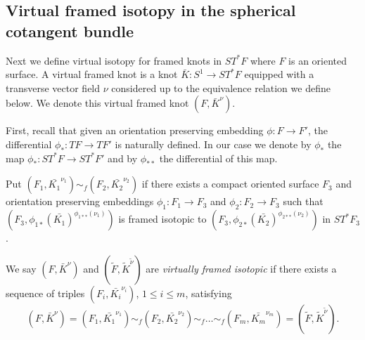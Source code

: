 \subsection{Virtual framed isotopy in the spherical cotangent bundle} 
Next we define virtual isotopy for framed knots in $ST^*F$ where $F$ is an oriented surface.  A virtual framed knot is a knot $\bar{K}:S^1 \rightarrow ST^*F$ equipped with a transverse vector field $\nu$ considered up to the equivalence relation we define below.  We denote this virtual framed knot $(F, \bar{K}^\nu)$.



First, recall that given an orientation preserving embedding $\phi : F \rightarrow F'$, the differential $\phi_*:TF \rightarrow TF'$ is naturally defined.  In our case we denote by $\phi_*$ the map $\phi_*:ST^*F \rightarrow ST^*F'$ and by $\phi_{**}$ the differential of this map.

Put $(F_1, \bar{K_1}^{\nu_1}) \sim_f (F_2, \bar{K_2}^{\nu_2})$ if there exists a compact oriented surface $F_3$ and orientation preserving embeddings $\phi_1: F_1\rightarrow F_3$ and $\phi_2: F_2\rightarrow F_3$ such that $(F_3, \phi_{1*}(\bar{K_1})^{\phi_{1**}(\nu_1)})$ is framed isotopic to $(F_3, \phi_{2*}(\bar{K_2})^{\phi_{2**}(\nu_2)})$ in $ST^*F_3$.

  We say $(F,\bar{K}^\nu)$ and $(\tilde{F},\tilde{K}^{\tilde{\nu}})$ are {\it virtually framed isotopic} if there exists a sequence of triples $(F_i,\bar{K_i}^{\nu_i})$, $1\leq i \leq m$, satisfying
  $$(F,\bar{K}^\nu)=(F_1,\bar{K_1}^{\nu_1})\sim_f (F_2,\bar{K_2}^{\nu_2})\sim_f \dots \sim_f (F_m,\bar{K_m}^{\nu_m})=(\tilde{F},\tilde{K}^{\tilde{\nu}}).$$

